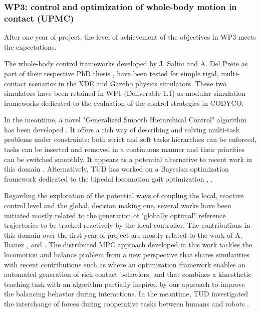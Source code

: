 \documentclass[12pt,a4paper,twoside]{article}
\begin{document}
\subsubsection{WP3: control and optimization of whole-body motion in contact (UPMC)}

After one year of project, the level of achievement of the objectives in WP3 meets the expectations.

The whole-body control frameworks developed by J. Salini and A. Del Prete as part of their respective PhD thesis \cite{salini2012}, \cite{delprete2013} have been tested for simple rigid, multi-contact scenarios in the XDE \cite{XDE} and Gazebo \cite{Gazebo} physics simulators. These two simulators have been retained in WP1 (Deliverable 1.1) as modular simulation frameworks dedicated to the evaluation of the control strategies in CODYCO.

In the meantime, a novel "Generalized Smooth Hierarchical Control" algorithm has been developed \cite{liu2013}. It offers a rich way of describing and solving multi-task problems under constraints: both strict and soft tasks hierarchies can be enforced, tasks can be inserted and removed in a continuous manner and their priorities can be switched smoothly. It appears as a potential alternative to recent work in this domain \cite{escande2012}. Alternatively, TUD has worked on a Bayesian optimization framework dedicated to the bipedal locomotion gait optimization \cite{calandra2014}, \cite{calandra2014b}.

Regarding the exploration of the potential ways of coupling the local, reactive control level and the global, decision making one, several works have been initiated mostly related to the generation of "globally optimal" reference trajectories to be tracked reactively by the local controller. The contributions in this domain over the first year of project are mostly related to the work of A. Ibanez \cite{ibanez2013}, \cite{ibanez2014-icra} and \cite{ibanez2014-ark}. The distributed MPC approach developed in this work tackles the locomotion and balance problem from a new perspective that shares similarities with recent contributions such as \cite{mordatch2012} where an optimization framework enables an automated generation of rich contact behaviors, and \cite{ott2013} that combines a kinesthetic teaching task with an algorithm partially inspired by our approach to improve the balancing behavior during interactions. In the meantime, TUD investigated the interchange of forces during cooperative tasks between humans and robots \cite{berger2013}.
\end{document}
